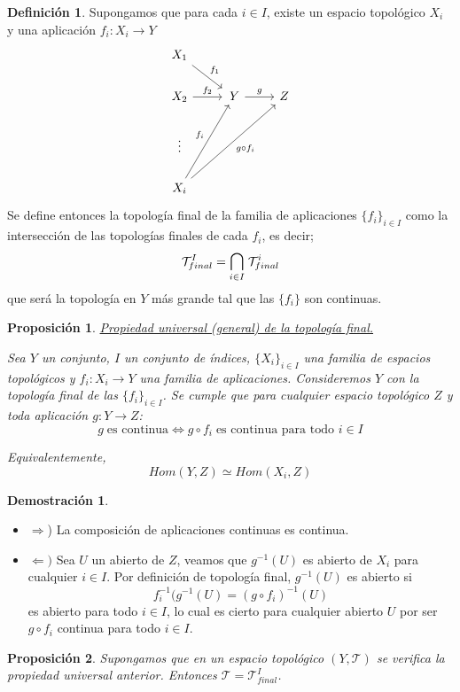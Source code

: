 \documentclass[12pt,twoside]{report}
\newcommand\mc[1]{\mathcal{#1}}
\theoremstyle{azul}
\theoremstyle{azul2}
\theoremstyle{plain}
\newtheorem*{prop}{Proposición}
\theoremstyle{definition}
\newtheorem*{defi}{Definición}
\newtheorem*{dem}{Demostración}
\theoremstyle{remark}
\begin{document}
\begin{defi}
Supongamos que para cada $i \in I$, existe un espacio topológico $X_i$ y una aplicación $f_i: X_i \longrightarrow Y$ 
$$\begin{tikzcd}
X_1  \arrow{rd}{f_1} & \\
X_2 \arrow{r}{f_2} & \, Y  \arrow{r}{g} & Z \\
\vdots & \\
X_i \arrow {ruu}{f_i} \arrow{rruu}[swap]{g \circ f_i}& 
\end{tikzcd}
$$
Se define entonces la topología final de la familia de aplicaciones 
$\{f_i\}_{i \in I}$ como la intersección de las topologías finales de cada $f_i$, es decir; 
$$\mathcal{T}_{final}^I = \mathlarger{\bigcap}_{i \in I} \;  \mc{T}_{final}^i $$
que será la topología en $Y$ más grande tal que las $\{f_i\}$ son continuas. 
\end{defi}
\begin{prop} \underline{Propiedad universal (general) de la topología final.} 

Sea $Y$ un conjunto, $I$ un conjunto de índices, $\{X_i\}_{i\in I}$ una familia de espacios topológicos y $f_i:X_i\longrightarrow Y$ una familia de aplicaciones. Consideremos $Y$ con la topología final de las $\{f_i\}_{i\in I}$. Se cumple que para cualquier espacio topológico $Z$ y toda aplicación $g:Y\longrightarrow Z$:
$$g \; \text{es continua} \iff g\circ f_i\;\text{es continua para todo }i\in I$$

Equivalentemente, $$Hom(Y,Z) \simeq Hom (X_i,Z)$$
\end{prop}
 \: \vspace{-15mm} \begin{dem} \: \vspace{-5mm}
\begin{itemize} 
    \item $\Rightarrow$) La composición de aplicaciones continuas es continua.
    \item  $\Leftarrow)$ Sea $U$ un abierto de $Z$, veamos que $g^{-1}(U)$ es abierto de $X_i$ para cualquier $i\in I$. Por definición de topología final, $g^{-1}(U)$ es abierto si
$$f_i^{-1}(g^{-1}(U)=(g\circ f_i)^{-1}(U)$$
es abierto para todo $i\in I$, lo cual es cierto para cualquier abierto $U$ por ser $g\circ f_i$ continua para todo $i\in I$.
\end{itemize}
\end{dem}
\begin{prop}
Supongamos que en un espacio topológico $(Y,\mc{T})$ se verifica la propiedad universal anterior. Entonces $\mc{T}=\mc{T}_{final}^I$.
\end{prop}
\end{document}
